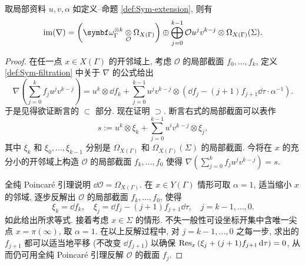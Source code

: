 \begin{lemma}\label{prop:nabla-image-computation}
	取局部资料 $u, v, \alpha$ 如定义--命题 \ref{def:Sym-extension}, 则有
	\[ \Image(\nabla) = \left( \bomega_\Gamma^{\otimes k} \dotimes{\mathcal{O}} \Omega_{X(\Gamma)} \right) \oplus \bigoplus_{j=0}^{k-1} \mathcal{O} u^j v^{k-j} \otimes \Omega_{X(\Gamma)}(\Sigma). \]
\end{lemma}
\begin{proof}
	在任一点 $x \in X(\Gamma)$ 的开邻域上, 考虑 $\mathcal{O}$ 的局部截面 $f_0, \ldots, f_k$, 定义 \ref{def:Sym-filtration} 中关于 $\nabla$ 的公式给出
	\begin{equation}\label{eqn:Shimura-grading-computation-aux}
		\nabla\left( \sum_{j=0}^k f_j u^j v^{k-j} \right) = u^k \otimes \dd f_k + \sum_{j=0}^{k-1} u^j v^{k-j} \otimes \left( \dd f_j - (j+1) f_{j+1} \dd\tau \cdot \alpha^{-1}\right).
	\end{equation}
	于是见得欲证断言的 $\subset$ 部分. 现在证明 $\supset$. 断言右式的局部截面可以表作
	\[ s := u^k \otimes \xi_k + \sum_{j = 0}^{k-1} u^i v^{k-j} \otimes \xi_j, \]
	其中 $\xi_k$ 和 $\xi_0, \ldots, \xi_{k-1}$ 分别是 $\Omega_{X(\Gamma)}$ 和 $\Omega_{X(\Gamma)}(\Sigma)$ 的局部截面. 今将在 $x$ 的充分小的开邻域上构造 $\mathcal{O}$ 的局部截面 $f_k, \ldots, f_0$ 使得 $\nabla \left( \sum_{j=0}^k f_j u^j v^{k-j}\right) = s$.

	全纯 Poincaré 引理说明 $\dd \mathcal{O} = \Omega_{X(\Gamma)}$. 在 $x \in Y(\Gamma)$ 情形可取 $\alpha = 1$, 适当缩小 $x$ 的邻域, 逐步反解出 $\mathcal{O}$ 的局部截面 $f_k, \ldots, f_0$, 使得
	\[ \xi_k = \dd f_k, \quad \xi_j = \dd f_j - (j+1) f_{j+1} \dd\tau, \quad j = k-1, \ldots, 0. \]
	如此给出所求等式. 接着考虑 $x \in \Sigma$ 的情形. 不失一般性可设坐标开集中含唯一尖点 $x = \pi(\infty)$, 取 $\alpha = 1$. 在以上反解过程中, 对 $j = k-1, \ldots, 0$ 之每一步, 求出的 $f_{j+1}$ 都可以适当地平移 (不改变 $\dd f_{j+1}$) 以确保 $\operatorname{Res}_x \left( \xi_j + (j+1) f_{j+1} \mathop{}\!\mathrm{d}\tau \right) = 0$, 从而仍可用全纯 Poincaré 引理反解 $\mathcal{O}$ 的截面 $f_j$.
\end{proof}

